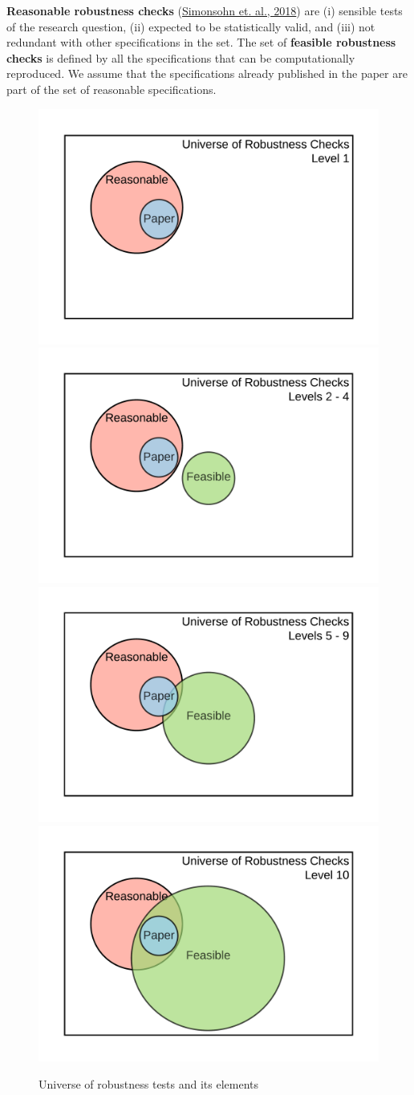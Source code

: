 \documentclass[
]{book}
\begin{document}
\textbf{Reasonable robustness checks} (\href{https://urisohn.com/sohn_files/wp/wordpress/wp-content/uploads/Paper-Specification-curve-2018-11-02.pdf}{Simonsohn et. al., 2018}) are (i) sensible tests of the research question, (ii) expected to be statistically valid, and (iii) not redundant with other specifications in the set. The set of \textbf{feasible robustness checks} is defined by all the specifications that can be computationally reproduced. We assume that the specifications already published in the paper are part of the set of reasonable specifications.

\begin{figure}
\includegraphics[width=0.5\linewidth]{robustness_lvl1} \includegraphics[width=0.5\linewidth]{robustness_lvl2_4} \includegraphics[width=0.5\linewidth]{robustness_lvl5-9} \includegraphics[width=0.5\linewidth]{robustness_lvl10} \caption{Universe of robustness tests and its elements}\label{fig:robusts}
\end{figure}
\end{document}
